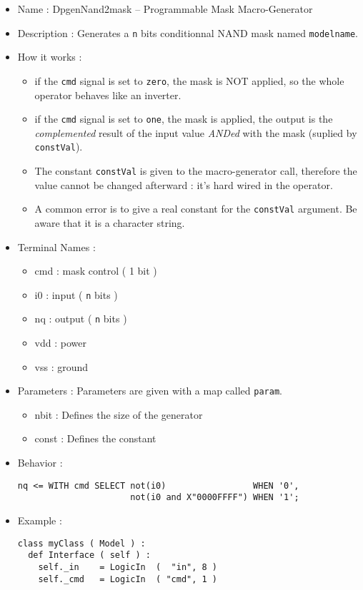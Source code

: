 \begin{itemize}
    \item Name : DpgenNand2mask -- Programmable Mask Macro-Generator
    \item Description : Generates a \verb-n- bits conditionnal NAND mask named \verb-modelname-.
    \item How it works :
    \begin{itemize}
        \item if the \verb-cmd- signal is set to \verb-zero-, the mask is NOT applied, so the whole operator behaves like an inverter.
        \item if the \verb-cmd- signal is set to \verb-one-, the mask is applied, the output is the \emph{complemented} result of the input value \emph{ANDed} with the mask (suplied by \verb-constVal-).
        \item The constant \verb-constVal- is given to the macro-generator call, therefore the value cannot be changed afterward : it's hard wired in the operator.
        \item A common error is to give a real constant for the \verb-constVal- argument. Be aware that it is a character string.
    \end{itemize}
    \item Terminal Names :
    \begin{itemize}
        \item cmd : mask control ( 1 bit )
        \item i0 : input ( \verb-n- bits )
        \item nq : output ( \verb-n- bits )
        \item vdd : power
        \item vss : ground
    \end{itemize}
    \item Parameters : Parameters are given with a map called \verb-param-.
    \begin{itemize}
        \item nbit : Defines the size of the generator
        \item const : Defines the constant
    \end{itemize}
    \item Behavior :
\begin{verbatim}
nq <= WITH cmd SELECT not(i0)                 WHEN '0',
                      not(i0 and X"0000FFFF") WHEN '1';
\end{verbatim}
    \item Example :
\begin{verbatim}
class myClass ( Model ) :
  def Interface ( self ) :
    self._in    = LogicIn  (  "in", 8 )
    self._cmd   = LogicIn  ( "cmd", 1 )
    

\end{verbatim}
\end{itemize}
